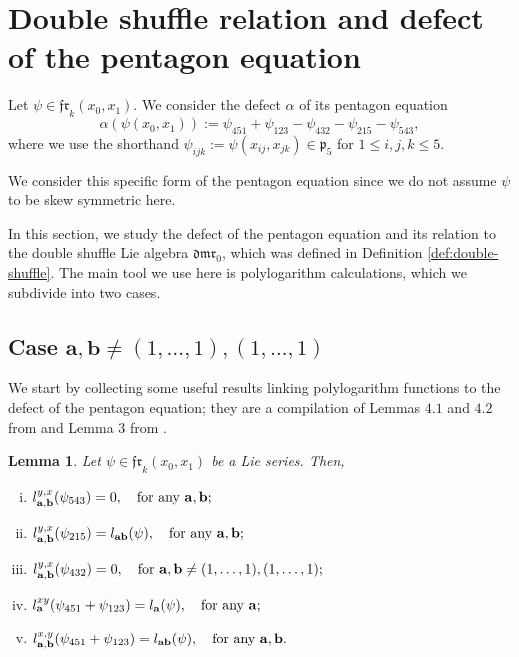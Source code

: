 \documentclass[a4paper,fleqn]{cas-sc}
\newtheorem{lemma}[theorem]{Lemma}
\begin{document}
\section{Double shuffle relation and defect of the pentagon equation}
\label{sec:poly-descr-double-shuffle}

Let $\psi\in \mathfrak{fr}_k(x_0,x_1)$. We consider the defect $\alpha$ of its pentagon equation
\begin{equation}\label{eq:defect-no-skew}
\alpha\left(\psi(x_0,x_1)\right):=\psi_{451}+\psi_{123}-\psi_{432}-\psi_{215}-\psi_{543},
\end{equation} 
where we use the shorthand $\psi_{ijk} := \psi(x_{ij},x_{jk})\in \mathfrak{p}_5$ for $1\le i,j,k\le 5$.

\begin{rmk}
We consider this specific form of the pentagon equation since we do not assume $\psi$ to be skew symmetric here.
\end{rmk}

In this section, we study the defect of the pentagon equation and its relation to the double shuffle Lie algebra $\mathfrak{dmr}_0$, which was defined in Definition \ref{def:double-shuffle}. The main tool we use here is polylogarithm calculations, which we subdivide into two cases.


\subsection{Case $\textbf{a},\textbf{b} \neq (1,\ldots, 1),(1,\ldots,1)$}
\label{subsection:indexnot1}

We start by collecting some useful results linking polylogarithm functions to the defect of the pentagon equation; they are a compilation of Lemmas $4.1$ and $4.2$ from \cite{Furusho2011} and Lemma $3$ from \cite{CS}.

\begin{lemma}
\label{lemma:polylogs-compilation}
Let $\psi \in \mathfrak{fr}_k(x_0,x_1)$ be a Lie series. Then,
\begin{enumerate}[(i)]
    \item \label{lemma:543}$l^{y,x}_{\bf{a},\bf{b}}(\psi_{543}) =0,\quad \text{for any}~ {\bf{a},\bf{b}};$
    \item \label{lemma:215} $l^{y,x}_{\bf{a},\bf{b}}(\psi_{215}) =l_{\bf{a}\bf{b}}(\psi),\quad \text{for any}~ {\bf{a},\bf{b}}; $
    \item \label{lemma:432} $l^{y,x}_{\bf{a},\bf{b}}(\psi_{432}) =0,\quad \text{for}~ {\bf{a},\bf{b}} \ne (1,\dots,1), (1,\dots,1);$
    \item \label{eq: 5 term_1} $l^{xy}_{\bf{a}}(\psi_{451}+\psi_{123})=l_{\bf{a}}(\psi),\quad \text{for any}~ {\bf{a}};$
    \item \label{eq: 5 term_2} $l^{x,y}_{\bf{a},\bf{b}}(\psi_{451}+\psi_{123})=l_{\bf{a}\bf{b}}(\psi),\quad \text{for any}~ {\bf{a},\bf{b}}.$
\end{enumerate}
\end{lemma}
\end{document}
